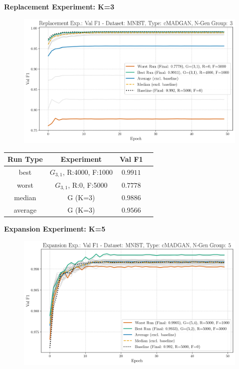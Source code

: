 \noindent\textbf{Replacement Experiment: K=3}
\begin{figure}[htbp]
	\centering
	\includegraphics[width=.85\textwidth]{abb/strat_classifier_performance/MNIST_STRATIFIED_CLASSIFIERS_cMADGAN_NEW/replacement_experiments/val_f1_score_cMADGAN_MNIST_n_gen_3_all.png}
	\label{fig:app_strat_class_performance_replacement_exp._val_f1_score_3}
\end{figure}
\begin{table}[H]
	\vspace{-1em}
	\centering
	\begin{tabular}{|c|c|c|c|}
		\hline
		Run Type & Experiment & Val F1 \\ \hline
		best & \(G_{3, 1}\), R:4000, F:1000 & $0.9911$\\ \hline
		worst & \(G_{3, 1}\), R:0, F:5000 & $0.7778$\\ \hline
		median & G (K=3) & $0.9886$\\ \hline
		average & G (K=3) & $0.9566$
		\\ \hline
	\end{tabular}
\end{table}
\newpage
\noindent\textbf{Expansion Experiment: K=5}
\begin{figure}[htbp]
	\centering
	\includegraphics[width=.85\textwidth]{abb/strat_classifier_performance/MNIST_STRATIFIED_CLASSIFIERS_cMADGAN_NEW/expansion_experiments/val_f1_score_cMADGAN_MNIST_n_gen_5_all.png}
	\label{fig:app_strat_class_performance_expansion_exp._val_f1_score_5}
\end{figure}
